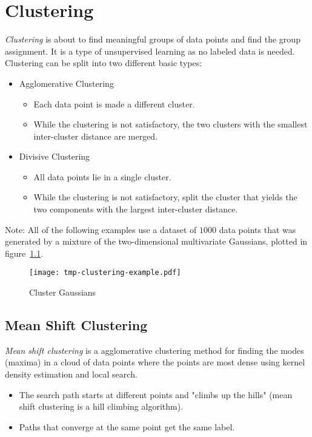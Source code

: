 \documentclass[a4paper, 11pt, accentcolor = tud3b]{tudreport}
\begin{document}
	\chapter{Clustering}
		\emph{Clustering} is about to find meaningful groups of data points and find the group assignment. It is a type of unsupervised learning as no labeled data is needed. Clustering can be split into two different basic types:
		\begin{itemize}
			\item Agglomerative Clustering
				\begin{itemize}
					\item Each data point is made a different cluster.
					\item While the clustering is not satisfactory, the two clusters with the smallest inter-cluster distance are merged.
				\end{itemize}
			\item Divisive Clustering
				\begin{itemize}
					\item All data points lie in a single cluster.
					\item While the clustering is not satisfactory, split the cluster that yields the two components with the largest inter-cluster distance.
				\end{itemize}
		\end{itemize}
		Note: All of the following examples use a dataset of \(1000\) data points that was generated by a mixture of the two-dimensional multivariate Gaussians, plotted in figure~\ref{fig:clusteringExample}.

		\begin{figure}
			\centering
			\texttt{[image: tmp-clustering-example.pdf]}
			\caption{Cluster Gaussians}
			\label{fig:clusteringExample}
		\end{figure}

		\section{Mean Shift Clustering}
			\emph{Mean shift clustering} is a agglomerative clustering method for finding the modes (maxima) in a cloud of data points where the points are most dense using kernel density estimation and local search.
			\begin{itemize}
				\item The search path starts at different points and "climbs up the hills" (mean shift clustering is a hill climbing algorithm).
				\item Paths that converge at the same point get the same label.
			\end{itemize}
\end{document}
